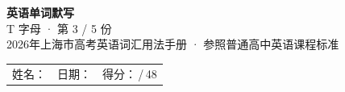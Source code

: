 \documentclass[10pt,a4paper]{article}
\begin{document}
\pagestyle{plain}

\begin{center}
{\LARGE\bfseries 英语单词默写}\\[0.22em]
{\large T 字母 · 第 3 / 5 份}\\[0.18em]
{\small 2026年上海市高考英语词汇用法手册 · 参照普通高中英语课程标准}
\end{center}

\vspace{0.25em}
\noindent\begin{tabular}{@{}p{}@{}p{}@{}p{}@{}}
姓名：\underline{\hspace{2.0cm}} & 日期：\underline{\hspace{2.0cm}} & 得分：\underline{\hspace{1.3cm}}\,/\,48 \\
\end{tabular}

\vspace{0.3em}

\vspace{0.08em}
\end{document}
